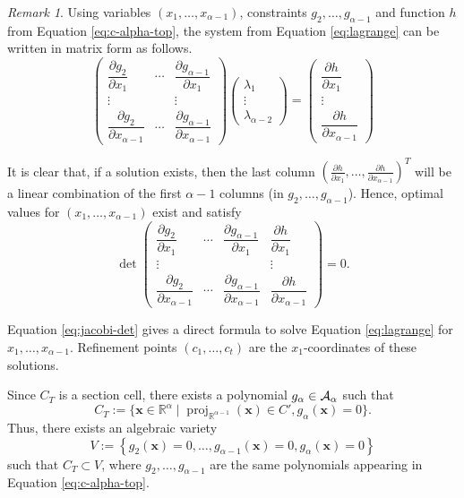 \documentclass[
]{book}
\theoremstyle{definition}
\theoremstyle{definition}
\theoremstyle{definition}
\theoremstyle{definition}
\theoremstyle{remark}
\newtheorem*{remark}{Remark}
\begin{document}
\begin{remark}
Using variables \((x_1,\ldots,x_{\alpha-1})\), constraints \(g_2,\ldots,g_{\alpha - 1}\) and function \(h\) from Equation \eqref{eq:c-alpha-top}, the system from Equation \eqref{eq:lagrange} can be written in matrix form as follows.
\[
\begin{pmatrix}\dfrac{\partial g_{2}}{\partial x_{1}} & \cdots & \dfrac{\partial g_{\alpha-1}}{\partial x_{1}}\\
\vdots &  & \vdots\\
\dfrac{\partial g_{2}}{\partial x_{\alpha-1}} & \cdots & \dfrac{\partial g_{\alpha-1}}{\partial x_{\alpha-1}}
\end{pmatrix}\begin{pmatrix}\lambda_{1}\\
\vdots\\
\lambda_{\alpha-2}
\end{pmatrix}=\begin{pmatrix}\dfrac{\partial h}{\partial x_{1}}\\
\vdots\\
\dfrac{\partial h}{\partial x_{\alpha-1}}
\end{pmatrix}
\]

It is clear that, if a solution exists, then the last column
\(\left(\tfrac{\partial h}{\partial x_{1}},\ldots, \tfrac{\partial h}{\partial x_{\alpha-1}}\right)^T\)
will be a linear combination of the first \(\alpha - 1\) columns (in \(g_2,\ldots,g_{\alpha - 1}\)).
Hence, optimal values for \((x_1,\ldots,x_{\alpha-1})\) exist and satisfy
\begin{equation}
\det\begin{pmatrix}\dfrac{\partial g_{2}}{\partial x_{1}} & \cdots & \dfrac{\partial g_{\alpha-1}}{\partial x_{1}} & \dfrac{\partial h}{\partial x_{1}}\\
\vdots &  &  & \vdots\\
\dfrac{\partial g_{2}}{\partial x_{\alpha-1}} & \cdots & \dfrac{\partial g_{\alpha-1}}{\partial x_{\alpha-1}} & \dfrac{\partial h}{\partial x_{\alpha-1}}
\end{pmatrix}=0.
\label{eq:jacobi-det}
\end{equation}
\end{remark}

Equation \eqref{eq:jacobi-det} gives a direct formula to solve Equation \eqref{eq:lagrange} for \(x_1,\ldots,x_{\alpha - 1}\). Refinement points \((c_1,\ldots,c_t)\) are the \(x_1\)-coordinates of these solutions.

Since \(C_T\) is a section cell, there exists a polynomial \(g_\alpha \in {\cal A}_\alpha\) such that \[
C_T := \{ \mathbf{x} \in \mathbb{R}^\alpha \mid {\operatorname{proj}_{\mathbb{R}^{\alpha - 1}}}(\mathbf{x}) \in C', g_\alpha(\mathbf{x}) = 0 \}.
\] Thus, there exists an algebraic variety
\begin{equation}
V := \left\{ g_2(\mathbf{x}) = 0, \ldots, g_{\alpha-1}(\mathbf{x}) = 0, g_\alpha(\mathbf{x}) = 0 \right\}
\label{eq:variety-v}
\end{equation}
such that \(C_T \subset V\), where \(g_2,\ldots,g_{\alpha - 1}\) are the same polynomials appearing in Equation \eqref{eq:c-alpha-top}.
\end{document}
